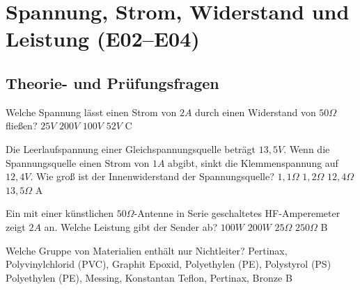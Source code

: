 \graphicspath{{e02-04_ET-Grundlagen/}}

\chapter{Spannung, Strom, Widerstand und Leistung (E02--E04)}



\section{Theorie- und Prüfungsfragen}


{Welche Spannung lässt einen Strom von $2A$ durch einen Widerstand von
$50\Omega$ fließen?}%
{$25V$}%
{$200V$}%
{$100V$}%
{$52V$}%
{C}%

{Die Leerlaufspannung einer Gleichspannungsquelle beträgt $13,5V$. Wenn die
Spannungsquelle einen Strom von $1A$ abgibt, sinkt die Klemmenspannung auf
$12,4V$. Wie groß ist der Innenwiderstand der Spannungsquelle?}%
{$1,1\Omega$}%
{$1,2\Omega$}%
{$12,4\Omega$}%
{$13,5\Omega$}%
{A}%

{Ein mit einer künstlichen $50\Omega$-Antenne in Serie geschaltetes
HF-Amperemeter zeigt $2A$ an. Welche Leistung gibt der Sender ab?}%
{$100W$}%
{$200W$}%
{$25\Omega$}%
{$250\Omega$}%
{B}%

{Welche Gruppe von Materialien enthält nur Nichtleiter?}%
{Pertinax, Polyvinylchlorid (PVC), Graphit}%
{Epoxid, Polyethylen (PE), Polystyrol (PS)}%
{Polyethylen (PE), Messing, Konstantan}%
{Teflon, Pertinax, Bronze}%
{B}%

